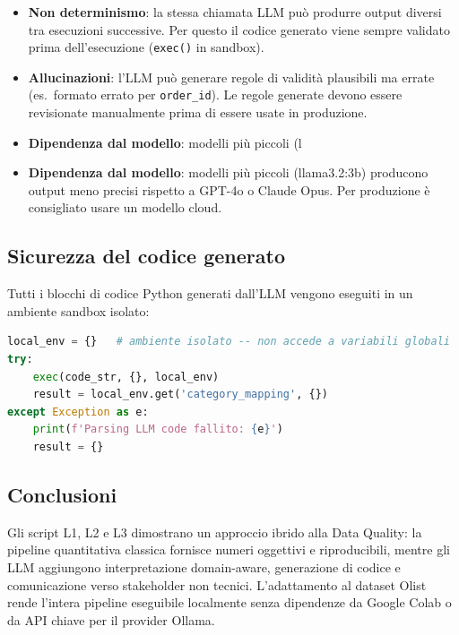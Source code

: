 \documentclass[12pt,a4paper]{article}
\begin{document}
\begin{itemize}
  \item \textbf{Non determinismo}: la stessa chiamata LLM può produrre output
        diversi tra esecuzioni successive. Per questo il codice generato viene
        sempre validato prima dell'esecuzione (\texttt{exec()} in sandbox).
  \item \textbf{Allucinazioni}: l'LLM può generare regole di validità plausibili
        ma errate (es.\ formato errato per \texttt{order\_id}). Le regole generate
        devono essere revisionate manualmente prima di essere usate in produzione.
  \item \textbf{Dipendenza dal modello}: modelli più piccoli (l  \item \textbf{Dipendenza dal modello}: modelli più piccoli (llama3.2:3b) producono
        output meno precisi rispetto a GPT-4o o Claude Opus. Per produzione è
        consigliato usare un modello cloud.
\end{itemize}

\subsection{Sicurezza del codice generato}

Tutti i blocchi di codice Python generati dall'LLM vengono eseguiti in un
ambiente sandbox isolato:

\begin{lstlisting}[language=Python, caption=Esecuzione sicura del codice LLM]
local_env = {}   # ambiente isolato -- non accede a variabili globali
try:
    exec(code_str, {}, local_env)
    result = local_env.get('category_mapping', {})
except Exception as e:
    print(f'Parsing LLM code fallito: {e}')
    result = {}
\end{lstlisting}

\subsection{Conclusioni}

Gli script L1, L2 e L3 dimostrano un approccio ibrido alla Data Quality:
la pipeline quantitativa classica fornisce numeri oggettivi e riproducibili,
mentre gli LLM aggiungono interpretazione domain-aware, generazione di codice
e comunicazione verso stakeholder non tecnici. L'adattamento al dataset Olist
rende l'intera pipeline eseguibile localmente senza dipendenze da Google Colab
o da API chiave per il provider Ollama.
\end{document}
